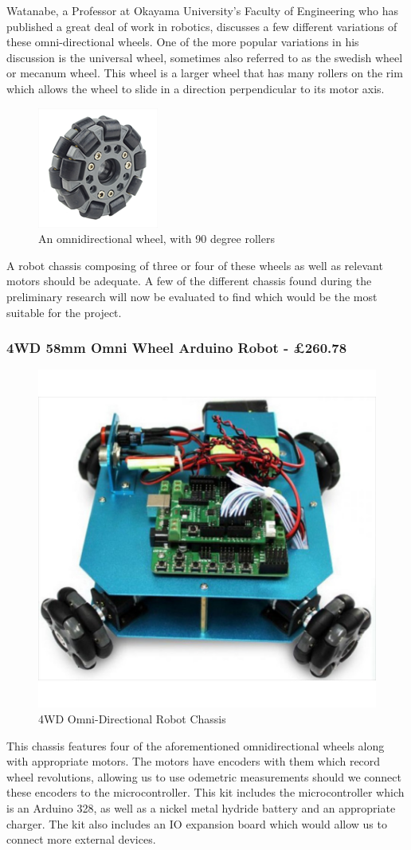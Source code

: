 				Watanabe\citep{watanabe1998control}, a Professor at Okayama University's Faculty of Engineering who has published a great deal of work in robotics, discusses a few different variations of these omni-directional wheels. One of the more popular variations in his discussion is the universal wheel, sometimes also referred to as the swedish wheel or mecanum wheel. This wheel is a larger wheel that has many rollers on the rim which allows the wheel to slide in a direction perpendicular to its motor axis. 
				
				\begin{figure}[h]
					\centering
					\includegraphics[width=.3\linewidth]{ANALYSIS/90degwheel.png}
					\caption{An omnidirectional wheel, with 90 degree rollers}
					\label{fig:1}
				\end{figure}
				
				A robot chassis composing of three or four of these wheels as well as relevant motors should be adequate. A few of the different chassis found during the preliminary research will now be evaluated to find which would be the most suitable for the project.
				
					\subsubsection{4WD 58mm Omni Wheel Arduino Robot - \pounds{260.78}}
					\begin{figure}[h]
						\centering
						\includegraphics[width=.3\linewidth]{ANALYSIS/4wdomnidirectionalarduino.jpg}
						\caption{4WD Omni-Directional Robot Chassis}
						\label{4WD Omni-Directional Robot Chassis}
					\end{figure}
					This chassis features four of the aforementioned omnidirectional wheels along with appropriate motors. The motors have encoders with them which record wheel revolutions, allowing us to use odemetric measurements should we connect these encoders to the microcontroller. This kit includes the microcontroller which is an Arduino 328, as well as a nickel metal hydride battery and an appropriate charger. The kit also includes an IO expansion board which would allow us to connect more external devices. 
				
